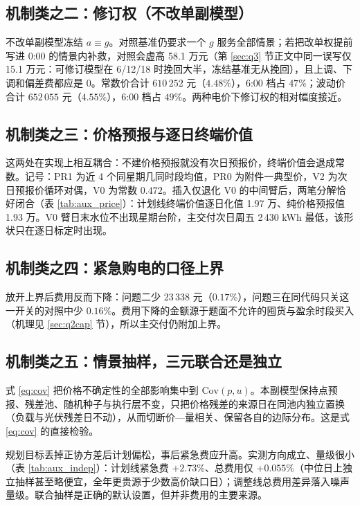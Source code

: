 \documentclass[12pt,a4paper]{ctexart}
\begin{document}
\subsection{机制类之二：修订权（不改单副模型）}

不改单副模型冻结 $a\equiv g$。对照基准仍要求一个 $g$ 服务全部情景；若把改单权提前写进 0:00 的情景内补救，对照会虚高 58.1 万元（第 \ref{sec:q3} 节正文中同一误写仅 15.1 万元：可修订模型在 6/12/18 时挽回大半，冻结基准无从挽回），且上调、下调和偏差费都应是 0。常数价合计 $610\,252$ 元（$4.48\%$），6:00 档占 $47\%$；波动价合计 $652\,055$ 元（$4.55\%$），6:00 档占 $49\%$。两种电价下修订权的相对幅度接近。

\subsection{机制类之三：价格预报与逐日终端价值}

这两处在实现上相互耦合：不建价格预报就没有次日预报价，终端价值会退成常数。记号：PR1 为近 4 个同星期几同时段均值，PR0 为附件一典型价，V2 为次日预报价循环对偶，V0 为常数 $0.472$。插入仅退化 V0 的中间臂后，两笔分解恰好闭合（表 \ref{tab:aux_price}）：计划线终端价值逐日化值 1.97 万、纯价格预报值 1.93 万。V0 臂日末水位不出现星期台阶，主交付次日周五 2\,430 kWh 最低，该形状只在逐日标定时出现。

\subsection{机制类之四：紧急购电的口径上界}

放开上界后费用反而下降：问题二少 23\,338 元（$0.17\%$），问题三在同代码只关这一开关的对照中少 $0.16\%$。费用下降的金额源于题面不允许的囤货与盈余时段买入（机理见 \ref{sec:q2cap} 节），所以主交付仍附加上界。

\subsection{机制类之五：情景抽样，三元联合还是独立}

式 \eqref{eq:cov} 把价格不确定性的全部影响集中到 $\mathrm{Cov}(p,u)$。本副模型保持点预报、残差池、随机种子与执行层不变，只把价格残差的来源日在同池内独立置换（负载与光伏残差日不动），从而切断价—量相关、保留各自的边际分布。这是式 \eqref{eq:cov} 的直接检验。

规划目标丢掉正协方差后计划偏松，事后紧急费应升高。实测方向成立、量级很小（表 \ref{tab:aux_indep}）：计划线紧急费 $+2.73\%$、总费用仅 $+0.055\%$（中位日上独立抽样甚至略便宜，全年更贵源于少数高价缺口日）；调整线总费用差异落入噪声量级。联合抽样是正确的默认设置，但并非费用的主要来源。
\end{document}
